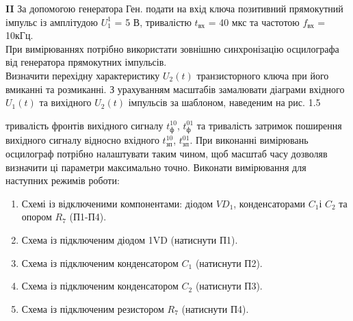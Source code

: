 \documentclass[a4paper,14pt]{extreport}
\begin{document}
\textbf{II} За допомогою генератора Ген. подати на вхід ключа позитивний
прямокутний імпульс із амплітудою $U_1^1$ = 5 В, тривалістю $t_{\text{вх}}$ = 40 мкс та частотою $f_{\text{вх}}$ = 10кГц.\\
При вимірюваннях потрібно використати зовнішню синхронізацію осцилографа від генератора прямокутних імпульсів.\\
Визначити перехідну характеристику $U_2(t)$ транзисторного ключа при
його вмиканні та розмиканні. З урахуванням масштабів замалювати діаграми
вхідного $U_1(t)$ та вихідного $U_2(t)$ імпульсів за шаблоном, наведеним на рис. 1.5%

тривалість фронтів вихідного сигналу $t^{10}_\text{ф}$, $t^{01}_\text{ф}$ та тривалість затримок поширення
вихідного сигналу відносно вхідного $t^{10}_\text{зп}$, $t^{01}_\text{зп}$. При
виконанні вимірювань осцилограф потрібно налаштувати таким чином, щоб
масштаб часу дозволяв визначити ці параметри максимально точно.
Виконати вимірювання для наступних режимів роботи:
\begin{enumerate}
	\item Схемі із відключеними компонентами: діодом $VD_1$, конденсаторами $C_1 $і $C_2$ та опором $R_7$ (П1-П4).
    \item Схема із підключеним діодом 1VD (натиснути П1).
    \item Схема із підключеним конденсатором $C_1$ (натиснути П2).
    \item Схема із підключеним конденсатором $C_2$ (натиснути П3).
    \item Схема із підключеним резистором $R_7$ (натиснути П4).
\end{enumerate}
\end{document}
